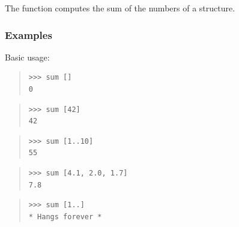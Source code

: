 \begin{haddockdesc}
\item[\begin{tabular}{@{}l}
sum :: (Foldable t, Num a) => t a -> a
\end{tabular}]
{\haddockbegindoc
The  function computes the sum of the numbers of a structure.\par
\subsubsection*{\textbf{Examples}}
Basic usage:\par
\begin{quote}
{\haddockverb\begin{verbatim}
>>> sum []
0

\end{verbatim}}
\end{quote}
\begin{quote}
{\haddockverb\begin{verbatim}
>>> sum [42]
42

\end{verbatim}}
\end{quote}
\begin{quote}
{\haddockverb\begin{verbatim}
>>> sum [1..10]
55

\end{verbatim}}
\end{quote}
\begin{quote}
{\haddockverb\begin{verbatim}
>>> sum [4.1, 2.0, 1.7]
7.8

\end{verbatim}}
\end{quote}
\begin{quote}
{\haddockverb\begin{verbatim}
>>> sum [1..]
* Hangs forever *

\end{verbatim}}
\end{quote}}
\end{haddockdesc}
